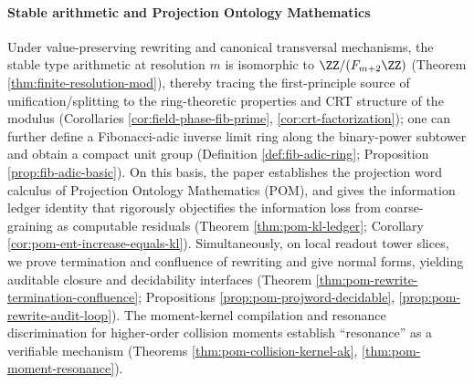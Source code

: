 \paragraph{Stable arithmetic and Projection Ontology Mathematics}
Under value-preserving rewriting and canonical transversal mechanisms, the stable type arithmetic at resolution \(m\) is isomorphic to \(\ZZ/(F_{m+2}\ZZ)\) (Theorem \ref{thm:finite-resolution-mod}), thereby tracing the first-principle source of unification/splitting to the ring-theoretic properties and CRT structure of the modulus (Corollaries \ref{cor:field-phase-fib-prime}, \ref{cor:crt-factorization}); one can further define a Fibonacci-adic inverse limit ring along the binary-power subtower and obtain a compact unit group (Definition \ref{def:fib-adic-ring}; Proposition \ref{prop:fib-adic-basic}). On this basis, the paper establishes the projection word calculus of Projection Ontology Mathematics (POM), and gives the information ledger identity that rigorously objectifies the information loss from coarse-graining as computable residuals (Theorem \ref{thm:pom-kl-ledger}; Corollary \ref{cor:pom-ent-increase-equals-kl}). Simultaneously, on local readout tower slices, we prove termination and confluence of rewriting and give normal forms, yielding auditable closure and decidability interfaces (Theorem \ref{thm:pom-rewrite-termination-confluence}; Propositions \ref{prop:pom-projword-decidable}, \ref{prop:pom-rewrite-audit-loop}). The moment-kernel compilation and resonance discrimination for higher-order collision moments establish ``resonance'' as a verifiable mechanism (Theorems \ref{thm:pom-collision-kernel-ak}, \ref{thm:pom-moment-resonance}).

